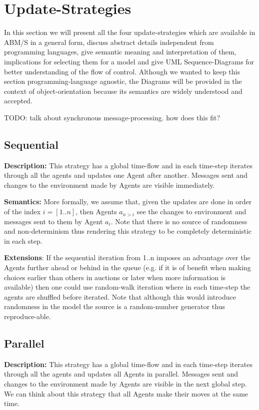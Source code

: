 \section{Update-Strategies}
In this section we will present all the four update-strategies which are available in ABM/S in a general form, discuss abstract details independent from programming languages, give semantic meaning and interpretation of them, implications for selecting them for a model and give UML Sequence-Diagrams for better understanding of the flow of control. Although we wanted to keep this section programming-language agnostic, the Diagrams will be provided in the context of object-orientation because its semantics are widely understood and accepted.

TODO: talk about synchronous message-processing. how does this fit?

\subsection{Sequential}
\textbf{Description:} This strategy has a global time-flow and in each time-step iterates through all the agents and updates one Agent after another. Messages sent and changes to the environment made by Agents are visible immediately. 

\textbf{Semantics:} More formally, we assume that, given the updates are done in order of the index $i = [1..n]$, then Agents $a_{n>i}$ see the changes to environment and messages sent to them by Agent $a_i$. Note that there is no source of randomness and non-determinism thus rendering this strategy to be completely deterministic in each step. 

\textbf{Extensions}: If the sequential iteration from 1..n imposes an advantage over the Agents further ahead or behind in the queue (e.g. if it is of benefit when making choices earlier than others in auctions or later when more information is available) then one could use random-walk iteration where in each time-step the agents are shuffled before iterated. Note that although this would introduce randomness in the model the source is a random-number generator thus reproduce-able.


\subsection{Parallel}
\textbf{Description:} This strategy has a global time-flow and in each time-step iterates through all the agents and updates all Agents in parallel. Messages sent and changes to the environment made by Agents are visible in the next global step. We can think about this strategy that all Agents make their moves at the same time. 


